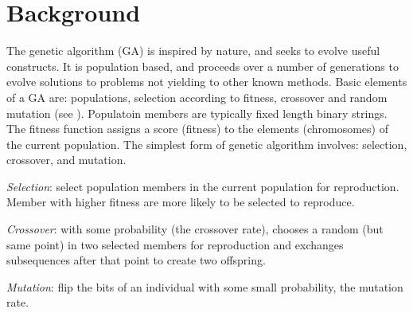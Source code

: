 \section{Background}
The genetic algorithm (GA) is inspired by nature, and seeks to evolve useful constructs. It is population based, and 
proceeds over a number of generations to evolve solutions to problems not yielding to other known methods. 
Basic elements of a GA are: 
populations, selection according to fitness, crossover and random mutation (see \cite{Mitchell1999}). 
Populatoin members are typically fixed length binary strings.   
The fitness function assigns a score (fitness) to the elements (chromosomes) of 
the current population. The simplest form of genetic algorithm involves: selection, crossover, and mutation.

\textit{Selection}: select population members in the current population for reproduction. 
Member with higher fitness are more likely to be selected to reproduce.

\textit{Crossover}: with some probability (the crossover rate), chooses a random (but same point) in two selected members for reproduction 
and exchanges subsequences after that point to create two offspring.

\textit{Mutation}: flip the bits of an individual with some small probability, 
the mutation rate.

